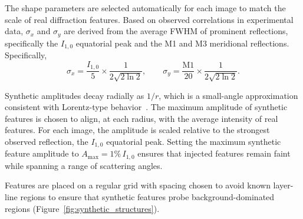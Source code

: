 \documentclass[iucr]{iucrjournals}
\begin{document}
The shape parameters are selected automatically for each image to match the scale of real diffraction features. Based on observed correlations in experimental data, $\sigma_x$ and $\sigma_y$ are derived from the average FWHM of prominent reflections, specifically the $I_{1,0}$ equatorial peak and the M1 and M3 meridional reflections. Specifically,
\begin{equation}
\sigma_x = \frac{I_{1,0}}{5} \times \frac{1}{2\sqrt{2\ln2}}, 
\qquad
\sigma_y = \frac{\mathrm{M1}}{20} \times \frac{1}{2\sqrt{2\ln2}}.
\end{equation}


Synthetic amplitudes decay radially as $1/r$, which is a small-angle approximation consistent with Lorentz-type behavior~\cite{Buerger1940,Denny1995}. The maximum amplitude of synthetic features is chosen to align, at each radius, with the average intensity of real features. For each image, the amplitude is scaled relative to the strongest observed reflection, the $I_{1,0}$ equatorial peak. Setting the maximum synthetic feature amplitude to $A_{\mathrm{max}} = 1\%\, I_{1,0}$ ensures that injected features remain faint while spanning a range of scattering angles.



Features are placed on a regular grid with spacing chosen to avoid known layer-line regions to ensure that synthetic features probe background-dominated regions (Figure~\ref{fig:synthetic_structures}).
\end{document}
